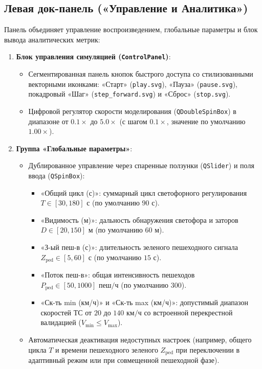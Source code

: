 \documentclass[11pt, a4paper]{article}
\begin{document}
\subsection{Левая док-панель («Управление и Аналитика»)}
Панель объединяет управление воспроизведением, глобальные параметры и блок вывода аналитических метрик:
\begin{enumerate}
  \item \textbf{Блок управления симуляцией (\texttt{ControlPanel})}:
  \begin{itemize}
    \item Сегментированная панель кнопок быстрого доступа со стилизованными векторными иконками: «Старт» (\texttt{play.svg}), «Пауза» (\texttt{pause.svg}), покадровый «Шаг» (\texttt{step\_forward.svg}) и «Сброс» (\texttt{stop.svg}).
    \item Цифровой регулятор скорости моделирования (\texttt{QDoubleSpinBox}) в диапазоне от $0.1\times$ до $5.0\times$ (с шагом $0.1\times$, значение по умолчанию $1.00\times$).
  \end{itemize}
  \item \textbf{Группа «Глобальные параметры»}:
  \begin{itemize}
    \item Дублированное управление через спаренные ползунки (\texttt{QSlider}) и поля ввода (\texttt{QSpinBox}):
    \begin{itemize}
      \item «Общий цикл (с)»: суммарный цикл светофорного регулирования $T \in [30, 180]\text{ с}$ (по умолчанию $90\text{ с}$).
      \item «Видимость (м)»: дальность обнаружения светофора и заторов $D \in [20, 150]\text{ м}$ (по умолчанию $60\text{ м}$).
      \item «З-ый пеш-в (с)»: длительность зеленого пешеходного сигнала $Z_{\text{ped}} \in [5, 60]\text{ с}$ (по умолчанию $15\text{ с}$).
      \item «Поток пеш-в»: общая интенсивность пешеходов $P_{\text{ped}} \in [50, 1000]\text{ пеш/ч}$ (по умолчанию $300$).
      \item «Ск-ть min (км/ч)» и «Ск-ть max (км/ч)»: допустимый диапазон скоростей ТС от $20$ до $140\text{ км/ч}$ со встроенной перекрестной валидацией ($V_{\min} \le V_{\max}$).
    \end{itemize}
    \item Автоматическая деактивация недоступных настроек (например, общего цикла $T$ и времени пешеходного зеленого $Z_{\text{ped}}$ при переключении в адаптивный режим или при совмещенной пешеходной фазе).

\end{itemize}
\end{enumerate}
\end{document}
